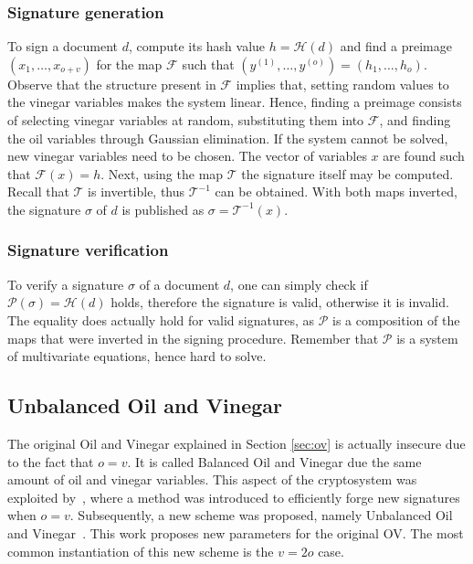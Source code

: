 \documentclass{ufsctex/ufsctex}
\begin{document}
\subsubsection{Signature generation}

To sign a document $d$, compute its hash value $h = \mathcal{H}(d)$ and find a
preimage $(x_1,\dots,x_{o+v})$ for the map $\mathcal{F}$ such that
$(y^{(1)},\dots,y^{(o)}) = (h_1,\dots,h_o)$. Observe that the structure present
in $\mathcal{F}$ implies that, setting random values to the vinegar variables
makes the system linear. Hence, finding a preimage consists of selecting
vinegar variables at random, substituting them into $\mathcal{F}$, and finding
the oil variables through Gaussian elimination. If the system cannot be solved,
new vinegar variables need to be chosen. The vector of variables $x$ are found
such that $\mathcal{F}(x)=h$. Next, using the map $\mathcal{T}$ the signature
itself may be computed. Recall that $\mathcal{T}$ is invertible, thus
$\mathcal{T}^{-1}$ can be obtained. With both maps inverted, the signature
$\sigma$ of $d$ is published as $\sigma = \mathcal{T}^{-1}(x)$.

\subsubsection{Signature verification}

To verify a signature $\sigma$ of a document $d$, one can simply check if
$\mathcal{P}(\sigma) = \mathcal{H}(d)$ holds, therefore the signature is valid,
otherwise it is invalid. The equality does actually hold for valid signatures,
as $\mathcal{P}$ is a composition of the maps that were inverted in the signing
procedure. Remember that $\mathcal{P}$ is a system of multivariate equations,
hence hard to solve.

\subsection{Unbalanced Oil and Vinegar}

The original Oil and Vinegar explained in Section \ref{sec:ov} is actually
insecure due to the fact that $o = v$. It is called Balanced Oil and Vinegar
due the same amount of oil and vinegar variables. This aspect of the
cryptosystem was exploited by~\cite{kipnis1998cryptanalysis}, where a method
was introduced to efficiently forge new signatures when $o = v$. Subsequently,
a new scheme was proposed, namely Unbalanced Oil and
Vinegar~\cite{kipnis1999unbalanced}. This work proposes new parameters for the
original OV. The most common instantiation of this new scheme is the $v = 2o$
case.
\end{document}
